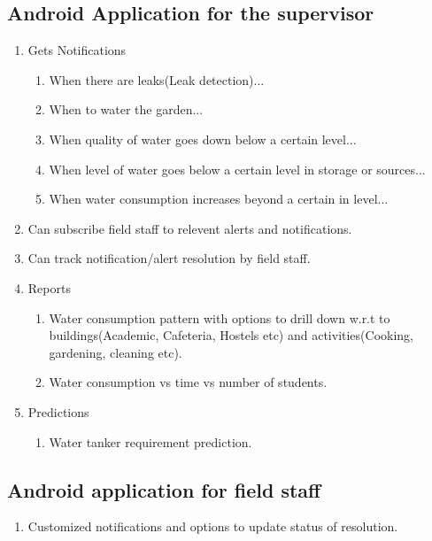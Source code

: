 \documentclass[paper=a4, fontsize=11pt]{scrartcl} %
\numberwithin{equation}{section} %
\numberwithin{figure}{section} %
\numberwithin{table}{section} %
\begin{document}
\subsection{Android Application for the supervisor}
\begin{enumerate}

\item 
Gets Notifications
\begin{enumerate}
\item
When there are leaks(Leak detection)...
\item
When to water the garden...
\item
When quality of water goes down below a certain level...
\item
When level of water goes below a certain level in storage or sources...
\item
When water consumption increases beyond a certain in level...
\end{enumerate}
\item
Can subscribe field staff to relevent alerts and notifications.
\item
Can track notification/alert resolution by field staff.
\item
Reports
\begin{enumerate}
\item
Water consumption pattern with options to drill down w.r.t to buildings(Academic, Cafeteria, Hostels etc) and activities(Cooking, gardening, cleaning etc).
\item
Water consumption vs time vs number of students.
\end{enumerate}
\item
Predictions
\begin{enumerate}
\item
Water tanker requirement prediction.
\end{enumerate}
\end{enumerate}


\subsection{Android application for field staff}
\begin{enumerate}
\item
Customized notifications and options to update status of resolution.
\end{enumerate}
\end{document}
